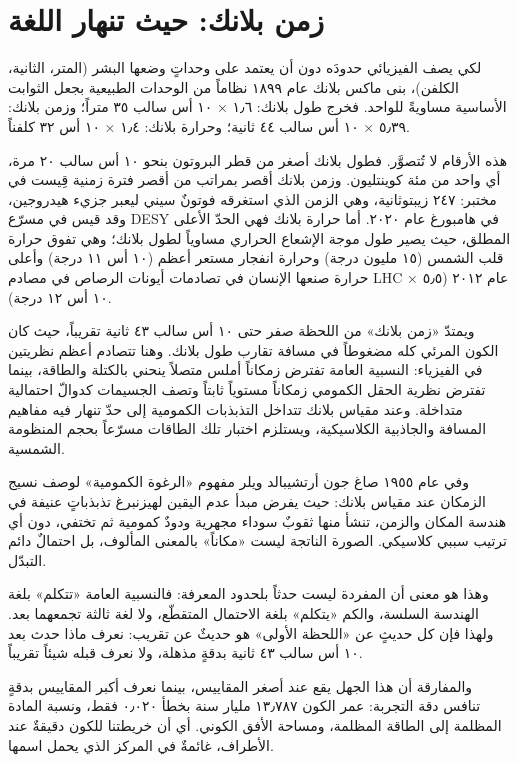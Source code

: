 \documentclass[12pt,a4paper,openany]{book}
\begin{document}
\chapter*{زمن بلانك: حيث تنهار اللغة}




لكي يصف الفيزيائي حدودَه دون أن يعتمد على وحداتٍ وضعها البشر (المتر، الثانية، الكلفن)، بنى ماكس بلانك عام ١٨٩٩ نظاماً من الوحدات الطبيعية بجعل الثوابت الأساسية مساويةً للواحد. فخرج طول بلانك: ١٫٦ × ١٠ أس سالب ٣٥ متراً؛ وزمن بلانك: ٥٫٣٩ × ١٠ أس سالب ٤٤ ثانية؛ وحرارة بلانك: ١٫٤ × ١٠ أس ٣٢ كلفناً.


هذه الأرقام لا تُتصوَّر. فطول بلانك أصغر من قطر البروتون بنحو ١٠ أس سالب ٢٠ مرة، أي واحد من مئة كوينتليون. وزمن بلانك أقصر بمراتب من أقصر فترة زمنية قِيست في مختبر: ٢٤٧ زيبتوثانية، وهي الزمن الذي استغرقه فوتونٌ سيني ليعبر جزيء هيدروجين، وقد قيس في مسرّع DESY في هامبورغ عام ٢٠٢٠. أما حرارة بلانك فهي الحدّ الأعلى المطلق، حيث يصير طول موجة الإشعاع الحراري مساوياً لطول بلانك؛ وهي تفوق حرارة قلب الشمس (١٥ مليون درجة) وحرارة انفجار مستعر أعظم (١٠ أس ١١ درجة) وأعلى حرارة صنعها الإنسان في تصادمات أيونات الرصاص في مصادم LHC عام ٢٠١٢ (٥٫٥ × ١٠ أس ١٢ درجة).


ويمتدّ «زمن بلانك» من اللحظة صفر حتى ١٠ أس سالب ٤٣ ثانية تقريباً، حيث كان الكون المرئي كله مضغوطاً في مسافة تقارب طول بلانك. وهنا تتصادم أعظم نظريتين في الفيزياء: النسبية العامة تفترض زمكاناً أملس متصلاً ينحني بالكتلة والطاقة، بينما تفترض نظرية الحقل الكمومي زمكاناً مستوياً ثابتاً وتصف الجسيمات كدوالّ احتمالية متداخلة. وعند مقياس بلانك تتداخل التذبذبات الكمومية إلى حدّ تنهار فيه مفاهيم المسافة والجاذبية الكلاسيكية، ويستلزم اختبار تلك الطاقات مسرّعاً بحجم المنظومة الشمسية.


وفي عام ١٩٥٥ صاغ جون أرتشيبالد ويلر مفهوم «الرغوة الكمومية» لوصف نسيج الزمكان عند مقياس بلانك: حيث يفرض مبدأ عدم اليقين لهيزنبرغ تذبذباتٍ عنيفة في هندسة المكان والزمن، تنشأ منها ثقوبٌ سوداء مجهرية ودودٌ كمومية ثم تختفي، دون أي ترتيب سببي كلاسيكي. الصورة الناتجة ليست «مكاناً» بالمعنى المألوف، بل احتمالٌ دائم التبدّل.


وهذا هو معنى أن المفردة ليست حدثاً بلحدود المعرفة: فالنسبية العامة «تتكلم» بلغة الهندسة السلسة، والكم «يتكلم» بلغة الاحتمال المتقطّع، ولا لغة ثالثة تجمعهما بعد. ولهذا فإن كل حديثٍ عن «اللحظة الأولى» هو حديثٌ عن تقريب: نعرف ماذا حدث بعد ١٠ أس سالب ٤٣ ثانية بدقةٍ مذهلة، ولا نعرف قبله شيئاً تقريباً.


والمفارقة أن هذا الجهل يقع عند أصغر المقاييس، بينما نعرف أكبر المقاييس بدقةٍ تنافس دقة التجربة: عمر الكون ١٣٫٧٨٧ مليار سنة بخطأ ٠٫٠٢٠ فقط، ونسبة المادة المظلمة إلى الطاقة المظلمة، ومساحة الأفق الكوني. أي أن خريطتنا للكون دقيقةٌ عند الأطراف، غائمةٌ في المركز الذي يحمل اسمها.
\end{document}
